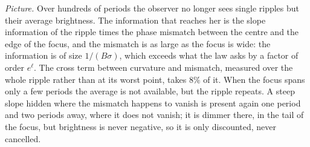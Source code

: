 \emph{Picture.}
Over hundreds of periods the observer no longer sees single ripples but their average brightness.
The information that reaches her is the slope information of the ripple times the phase mismatch between the centre and the edge of the focus, and the mismatch is as large as the focus is wide: the information is of size $1/(B\sigma)$, which exceeds what the law asks by a factor of order $e^\ell$.
The cross term between curvature and mismatch, measured over the whole ripple rather than at its worst point, takes $8\%$ of it.
When the focus spans only a few periods the average is not available, but the ripple repeats.
A steep slope hidden where the mismatch happens to vanish is present again one period and two periods away, where it does not vanish; it is dimmer there, in the tail of the focus, but brightness is never negative, so it is only discounted, never cancelled.
